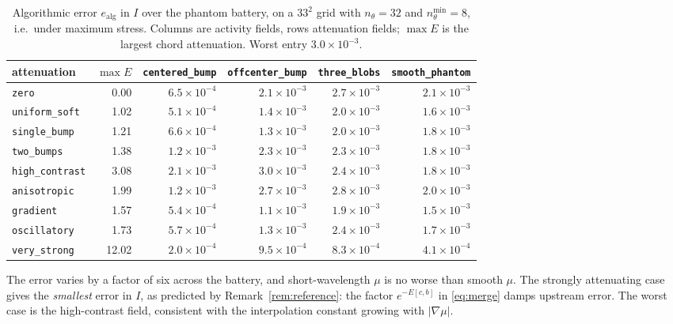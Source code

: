 \documentclass[11pt]{article}
\begin{document}
\begin{table}[t]
\centering\small
\caption{Algorithmic error $e_{\mathrm{alg}}$ in $I$ over the phantom
battery, on a $33^2$ grid with $n_\theta=32$ and $n_\theta^{\min}=8$, i.e.\
under maximum stress. Columns are activity fields, rows attenuation fields;
$\max E$ is the largest chord attenuation. Worst entry $3.0\!\times\!10^{-3}$.}
\label{tab:battery}
\begin{tabular}{lrrrrr}
\toprule
attenuation & $\max E$ & \texttt{centered\_bump} & \texttt{offcenter\_bump} & \texttt{three\_blobs} & \texttt{smooth\_phantom}\\
\midrule
\texttt{zero} & 0.00 & $6.5\!\times\!10^{-4}$ & $2.1\!\times\!10^{-3}$ & $2.7\!\times\!10^{-3}$ & $2.1\!\times\!10^{-3}$ \\
\texttt{uniform\_soft} & 1.02 & $5.1\!\times\!10^{-4}$ & $1.4\!\times\!10^{-3}$ & $2.0\!\times\!10^{-3}$ & $1.6\!\times\!10^{-3}$ \\
\texttt{single\_bump} & 1.21 & $6.6\!\times\!10^{-4}$ & $1.3\!\times\!10^{-3}$ & $2.0\!\times\!10^{-3}$ & $1.8\!\times\!10^{-3}$ \\
\texttt{two\_bumps} & 1.38 & $1.2\!\times\!10^{-3}$ & $2.3\!\times\!10^{-3}$ & $2.3\!\times\!10^{-3}$ & $1.8\!\times\!10^{-3}$ \\
\texttt{high\_contrast} & 3.08 & $2.1\!\times\!10^{-3}$ & $3.0\!\times\!10^{-3}$ & $2.4\!\times\!10^{-3}$ & $1.8\!\times\!10^{-3}$ \\
\texttt{anisotropic} & 1.99 & $1.2\!\times\!10^{-3}$ & $2.7\!\times\!10^{-3}$ & $2.8\!\times\!10^{-3}$ & $2.0\!\times\!10^{-3}$ \\
\texttt{gradient} & 1.57 & $5.4\!\times\!10^{-4}$ & $1.1\!\times\!10^{-3}$ & $1.9\!\times\!10^{-3}$ & $1.5\!\times\!10^{-3}$ \\
\texttt{oscillatory} & 1.73 & $5.7\!\times\!10^{-4}$ & $1.3\!\times\!10^{-3}$ & $2.4\!\times\!10^{-3}$ & $1.7\!\times\!10^{-3}$ \\
\texttt{very\_strong} & 12.02 & $2.0\!\times\!10^{-4}$ & $9.5\!\times\!10^{-4}$ & $8.3\!\times\!10^{-4}$ & $4.1\!\times\!10^{-4}$ \\
\bottomrule
\end{tabular}
\end{table}

The error varies by a factor of six across the battery, and short-wavelength
$\mu$ is no worse than smooth $\mu$. The strongly attenuating case gives the
\emph{smallest} error in $I$, as predicted by Remark~\ref{rem:reference}: the
factor $e^{-E[c,b]}$ in \eqref{eq:merge} damps upstream error. The worst case
is the high-contrast field, consistent with the interpolation constant growing
with $|\nabla\mu|$.
\end{document}
